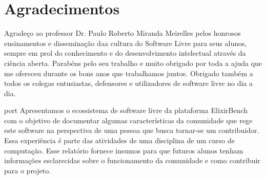 \chapter*{Agradecimentos}

Agradeço ao professor Dr. Paulo Roberto Miranda Meirelles pelos honrosos ensinamentos
e disseminação daa cultura do Software Livre para seus alunos, sempre em prol
do conhecimento e do desenvolvimento intelectual através da ciência aberta.
Parabéns pelo seu trabalho e muito obrigado por toda a ajuda que me ofereceu
durante os bons anos que trabalhamos juntos. Obrigado também a todos os colegas
entusiastas, defensores e utilizadores de software livre no dia a dia.

\begin{resumo}{port}
  Apresentamos o ecossistema de software livre da plataforma ElixirBench com o objetivo
  de documentar algumas características da comunidade que rege este software na
  perspectiva de uma pessoa que busca tornar-se um contribuidor. Essa experiência
  é parte das atividades de uma disciplina de um curso de computação. Esse relatório fornece
  insumos para que futuros alunos tenham informações esclarecidas sobre o funcionamento
  da comunidade e como contribuir para o projeto.
\end{resumo}



